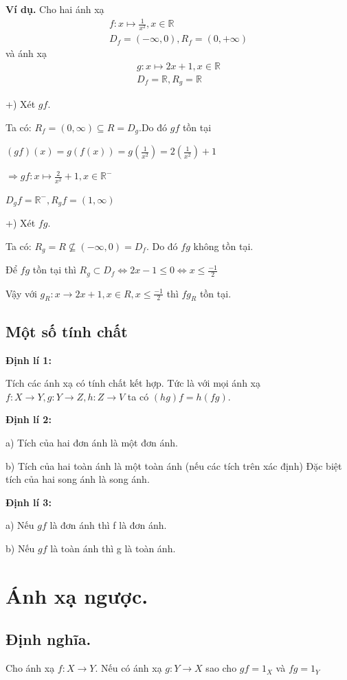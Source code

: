 \documentclass[12pt,oneside,a4paper,reqno]{book}
\begin{document}
\textbf{Ví dụ.} Cho hai ánh xạ 
\begin{align*}
f: x\mapsto \frac{1}{x^2}, x\in \mathbb{R}\\
D_f=(-\infty,0),R_f=(0,+\infty)
\end{align*} 
và ánh xạ 
\begin{align*}
g: x\mapsto 2x+1, x\in \mathbb{R}\\
D_f=\mathbb{R}, R_g=\mathbb{R}
\end{align*} 

+) Xét $gf.$

  Ta có: $R_f=(0,\infty) \subseteq R=D_g$.Do đó $gf$ tồn tại
  
   $(gf)(x)=g(f(x))=g(\frac{1}{x^2})=2(\frac{1}{x^2})+1$
   
   $\Rightarrow gf:x\mapsto \frac{2}{x^2}+1,x\in \mathbb{R}^-$
   
   $D_gf=\mathbb{R}^-,   R_gf=(1,\infty)$
   
+) Xét $fg$.

   Ta có: $R_g=R \nsubseteq (-\infty,0)=D_f$. Do đó $fg$ không tồn tại.
   
    Để $fg$ tồn tại thì $R_g\subset D_f\Leftrightarrow 2x-1\le 0
     \Leftrightarrow x\le \frac{-1}{2}$

 Vậy với $g_R:x\to 2x+1,x\in R,x\le \frac{-1}{2}$  thì $fg_R$  tồn tại.

\subsection{Một số tính chất}

\textbf{Định lí 1:}

Tích các ánh xạ có tính chất kết hợp. Tức là với mọi ánh xạ $f:X\to Y, g:Y\to Z,h: Z\to V$  ta có $(hg)f=h(fg).$

\textbf{Định lí 2:}

a) Tích của hai đơn ánh là một đơn ánh.

b) Tích của hai toàn ánh là một toàn ánh (nếu các tích trên xác định)
Đặc biệt tích của hai song ánh là song ánh.

\textbf{Định lí 3:}

a) Nếu $gf$ là đơn ánh thì f là đơn ánh.

b) Nếu $gf$ là toàn ánh thì g là toàn ánh.

\section{Ánh xạ ngược.}
\subsection{Định nghĩa.}
      Cho ánh xạ $f:X\to Y$. Nếu có ánh xạ $g:Y\to X$ sao cho $gf=1_X$  và $fg=1_Y$
\end{document}
